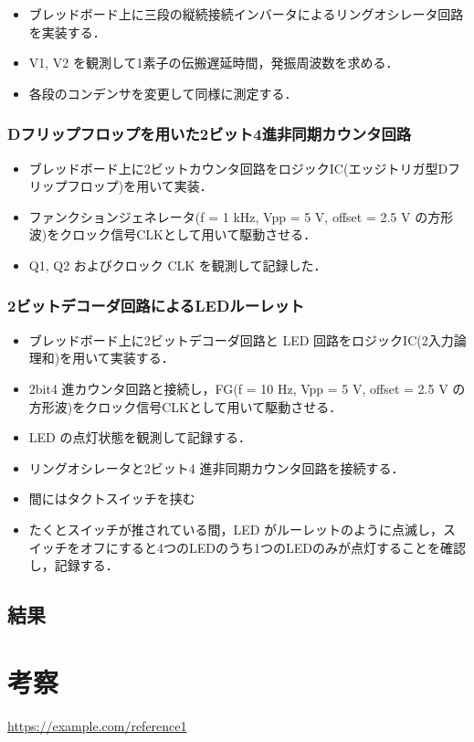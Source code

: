 \documentclass{ltjsarticle}
\begin{document}
\begin{itemize}
  \item ブレッドボード上に三段の縦続接続インバータによるリングオシレータ回路を実装する．
  \item V1, V2 を観測して1素子の伝搬遅延時間，発振周波数を求める．
  \item 各段のコンデンサを変更して同様に測定する．
\end{itemize}

\subsubsection{Dフリップフロップを用いた2ビット4進非同期カウンタ回路}
\begin{itemize}
  \item ブレッドボード上に2ビットカウンタ回路をロジックIC(エッジトリガ型Dフリップフロップ)を用いて実装．
  \item ファンクションジェネレータ(f = 1 kHz, Vpp = 5 V, offset = 2.5 V の方形波)をクロック信号CLKとして用いて駆動させる．
  \item Q1, Q2 およびクロック CLK を観測して記録した．
\end{itemize}

\subsubsection{2ビットデコーダ回路によるLEDルーレット}
\begin{itemize}
  \item ブレッドボード上に2ビットデコーダ回路と LED 回路をロジックIC(2入力論理和)を用いて実装する．
  \item 2bit4 進カウンタ回路と接続し，FG(f = 10 Hz, Vpp = 5 V, offset = 2.5 V の方形波)をクロック信号CLKとして用いて駆動させる．
  \item LED の点灯状態を観測して記録する．
\end{itemize}

\begin{itemize}
  \item リングオシレータと2ビット4 進非同期カウンタ回路を接続する．
  \item 間にはタクトスイッチを挟む
  \item たくとスイッチが推されている間，LED がルーレットのように点滅し，スイッチをオフにすると4つのLEDのうち1つのLEDのみが点灯することを確認し，記録する．
\end{itemize}
\subsection{結果}

\section{考察}

\begin{thebibliography}{9}
 \url{https://example.com/reference1}
\end{thebibliography}
\end{document}
